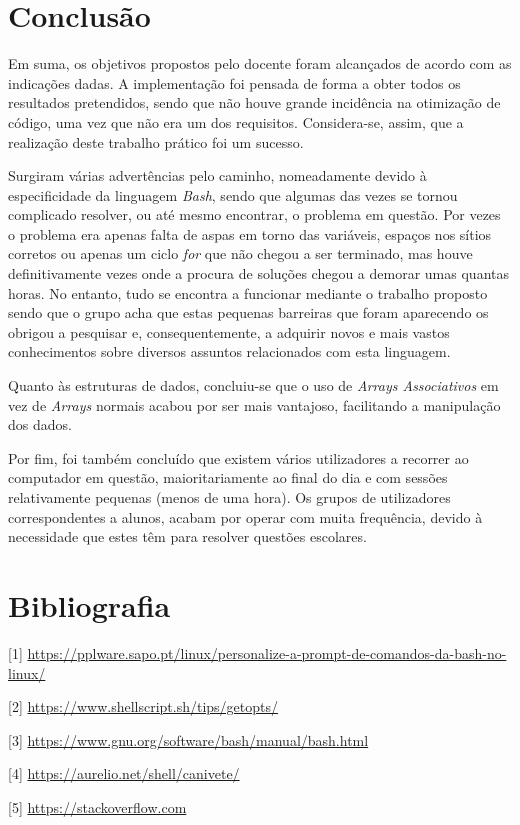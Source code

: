 \documentclass[10pt,portuguese]{article}
\begin{document}
\clearpage

\section{Conclusão}
\par Em suma, os objetivos propostos pelo docente foram alcançados de acordo com as indicações dadas. A implementação foi pensada de forma a obter todos os resultados pretendidos, sendo que não houve grande incidência na otimização de código, uma vez que não era um dos requisitos. Considera-se, assim, que a realização deste trabalho prático foi um sucesso.
\par Surgiram várias advertências pelo caminho, nomeadamente devido à especificidade da linguagem \textit{Bash}, sendo que algumas das vezes se tornou complicado resolver, ou até mesmo encontrar, o problema em questão. Por vezes o problema era apenas falta de aspas em torno das variáveis, espaços nos sítios corretos ou apenas um ciclo \textit{for} que não chegou a ser terminado, mas houve definitivamente vezes onde a procura de soluções chegou a demorar umas quantas horas. No entanto, tudo se encontra a funcionar mediante o trabalho proposto sendo que o grupo acha que estas pequenas barreiras que foram aparecendo os obrigou a pesquisar e, consequentemente, a adquirir novos e mais vastos conhecimentos sobre diversos assuntos relacionados com esta linguagem.
\par Quanto às estruturas de dados, concluiu-se que o uso de \textit{Arrays Associativos} em vez de \textit{Arrays} normais acabou por ser mais vantajoso, facilitando a manipulação dos dados.
\par Por fim, foi também concluído que existem vários utilizadores a recorrer ao computador em questão, maioritariamente ao final do dia e com sessões relativamente pequenas (menos de uma hora). Os grupos de utilizadores correspondentes a alunos, acabam por operar com muita frequência, devido à necessidade que estes têm para resolver questões escolares.


\clearpage

\section{Bibliografia}





\vspace{5mm} %

[1] \url{https://pplware.sapo.pt/linux/personalize-a-prompt-de-comandos-da-bash-no-linux/}

[2] \url{https://www.shellscript.sh/tips/getopts/}

[3] \url{https://www.gnu.org/software/bash/manual/bash.html}

[4] \url{https://aurelio.net/shell/canivete/}

[5] \url{https://stackoverflow.com}
\end{document}
